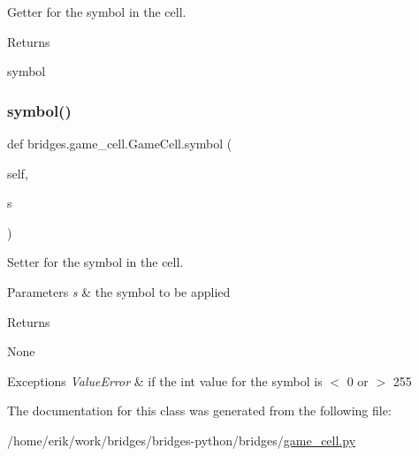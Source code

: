 Getter for the symbol in the cell. 

\begin{DoxyReturn}{Returns}


symbol 
\end{DoxyReturn}
\mbox{\label{classbridges_1_1game__cell_1_1_game_cell_a2ce9aa7d7d7835c511338c65a1457e22}} 
\subsubsection{\texorpdfstring{symbol()}{symbol()}\hspace{0.1cm}{\footnotesize\ttfamily [2/2]}}
{\footnotesize\ttfamily def bridges.\+game\+\_\+cell.\+Game\+Cell.\+symbol (\begin{DoxyParamCaption}\item[{}]{self,  }\item[{}]{s }\end{DoxyParamCaption})}



Setter for the symbol in the cell. 


\begin{DoxyParams}{Parameters}
{\em s} & the symbol to be applied \\
\hline
\end{DoxyParams}
\begin{DoxyReturn}{Returns}


None
\end{DoxyReturn}

\begin{DoxyExceptions}{Exceptions}
{\em Value\+Error} & if the int value for the symbol is $<$ 0 or $>$ 255 \\
\hline
\end{DoxyExceptions}


The documentation for this class was generated from the following file\+:\begin{DoxyCompactItemize}
\item 
/home/erik/work/bridges/bridges-\/python/bridges/\hyperlink{game__cell_8py}{game\+\_\+cell.\+py}\end{DoxyCompactItemize}
